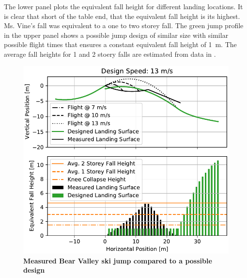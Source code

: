 \documentclass{article}
\begin{document}
The lower panel plots the equivalent fall height for different landing
locations. It is clear that short of the table end, that the equivalent fall
height is its highest. Ms. Vine's fall was equivalent to a one to two storey
fall. The green jump profile in the upper panel shows a possible jump design of
similar size with similar possible flight times that ensures a constant
equivalent fall height of 1~\si{\meter}. The average fall heights for 1 and 2
stoery falls are estimated from data in \cite{Vish2005}.
%
\begin{figure}
  \centering
  \includegraphics[width=5.25in]{figures/vine-v-bear-valley.pdf}
  \caption{\textbf{Measured Bear Valley ski jump compared to a possible design}}
  \label{fig:vine-v-bear-valley}
\end{figure}
\end{document}
